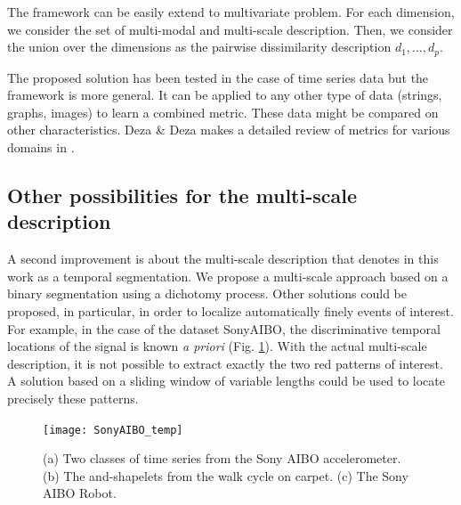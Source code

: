 \noindent The framework can be easily extend to multivariate problem. For each dimension, we consider the set of multi-modal and multi-scale description. Then,  we consider the union over the dimensions as the pairwise dissimilarity description $d_1, \ldots, d_p$. 

\noindent The proposed solution has been tested in the case of time series data but the framework is more general. It can be applied to any other type of data (strings, graphs, images) to learn a combined metric. These data might be compared on other characteristics. Deza \& Deza makes a detailed review of metrics for various domains in \cite{Deza2009}.


\subsection*{Other possibilities for the multi-scale description}
A second improvement is about the multi-scale description that denotes in this work as a temporal segmentation. We propose a multi-scale approach based on a binary segmentation using a dichotomy process. Other solutions could be proposed, in particular, in order to localize automatically finely events of interest. For example, in the case of the dataset SonyAIBO, the discriminative temporal locations of the signal is known \textit{a priori} (Fig. \ref{fig:SonyAIBO_tmp}). With the actual multi-scale description, it is not possible to extract exactly the two red patterns of interest. A solution based on a sliding window of variable lengths could be used to locate precisely these patterns. 

\begin{figure}[h!]
	\centering
	\texttt{[image: SonyAIBO\_temp]}
	\caption{(a) Two classes of time series from the Sony AIBO accelerometer. (b) The and-shapelets from the walk cycle on carpet. (c) The Sony AIBO Robot.\protect\footnotemark}
	\label{fig:SonyAIBO_tmp}
\end{figure}

